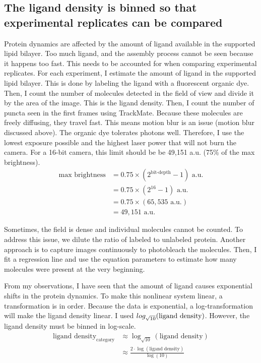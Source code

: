 \subsection{The ligand density is binned so that experimental replicates can be compared}
Protein dynamics are affected by the amount of ligand available in the supported lipid bilayer. Too much ligand, and the assembly process cannot be seen because it happens too fast. This needs to be accounted for when comparing experimental replicates. For each experiment, I estimate the amount of ligand in the supported lipid bilayer. This is done by labeling the ligand with a fluorescent organic dye. Then, I count the number of molecules detected in the field of view and divide it by the area of the image. This is the ligand density. Then, I count the number of puncta seen in the first frames using TrackMate. Because these molecules are freely diffusing, they travel fast. This means motion blur is an issue (motion blur discussed above). The organic dye tolerates photons well. Therefore, I use the lowest exposure possible and the highest laser power that will not burn the camera. For a 16-bit camera, this limit should be be 49,151 a.u. (75\% of the max brightness).
\begin{equation}
\begin{aligned}
\text{max brightness} &= 0.75 \times (2^\text{bit-depth} - 1)\text{ a.u.} \\
& = 0.75 \times(2^{16}-1)\text{ a.u.} \\
& = 0.75 \times (65,535\text{ a.u.}) \\
& = 49,151\text{ a.u.}
\end{aligned}
\end{equation}

Sometimes, the field is dense and individual molecules cannot be counted. To address this issue, we dilute the ratio of labeled to unlabeled protein. Another approach is to capture images continuously to photobleach the molecules. Then, I fit a regression line and use the equation parameters to estimate how many molecules were present at the very beginning. 

From my observations, I have seen that the amount of ligand causes exponential shifts in the protein dynamics. To make this nonlinear system linear, a transformation is in order. Because the data is exponential, a log-transformation will make the ligand density linear. I used $\\log_{\sqrt{10}}(\text{ligand density})$. However, the ligand density must be binned in log-scale.
\begin{equation}
\begin{aligned}
\text{ligand density}_\text{category} &\approx \log_{\sqrt{10}}(\text{ligand density})\\
&\approx \frac{2 \cdot \log(\text{ligand density})}{\log(10)}
\end{aligned}
\end{equation}


